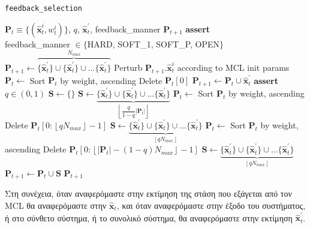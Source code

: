 \begin{algorithm}
  \caption{\texttt{feedback\_selection}}
  \begin{spacing}{1.2}
  \begin{algorithmic}[1]
    \REQUIRE $\bm{P}_t \equiv \{(\hat{\bm{x}}_t^i, w_t^i)\}$, $q$, $\hat{\bm{x}}^\prime_t$, feedback\_manner
    \ENSURE $\bm{P}_{t+1}$
    \STATE \textbf{assert} \\ feedback\_manner $\in \{$HARD, SOFT\_1, SOFT\_P, OPEN$\}$
      \STATE $\bm{P}_{t+1} \leftarrow \overbrace{\{\hat{\bm{x}}^\prime_t\} \cup \{\hat{\bm{x}}^\prime_t\} \cup \dots \{\hat{\bm{x}}^\prime_t\}}^{N_{max}}$
      \STATE Perturb $\bm{P}_{t+1}.\hat{\bm{x}}_t^i$ according to MCL init params
    \ENDIF
        \STATE $\bm{P}_t \leftarrow$ Sort $\bm{P}_t$ by weight, ascending
        \STATE Delete $\bm{P}_t[0]$
      \ENDIF
      \STATE $\bm{\bm{P}}_{t+1} \leftarrow \bm{P}_t \cup \hat{\bm{x}}^\prime_t$
    \ENDIF
      \STATE \textbf{assert} $q \in (0,1)$
      \STATE $\bm{S} \leftarrow \{\}$
        \STATE $\bm{S} \leftarrow \underbrace{\{\hat{\bm{x}}^\prime_t\} \cup \{\hat{\bm{x}}^\prime_t\} \cup \dots \{\hat{\bm{x}}^\prime_t\}}_{\left\lfloor\dfrac{q}{1-q}|\bm{P}_t|\right\rfloor}$
        \STATE $\bm{P}_t \leftarrow$ Sort $\bm{P}_t$ by weight, ascending
        \STATE Delete $\bm{P}_t[0: \left\lfloor qN_{max} \right\rfloor-1]$
        \STATE $\bm{S} \leftarrow \underbrace{\{\hat{\bm{x}}^\prime_t\} \cup \{\hat{\bm{x}}^\prime_t\} \cup \dots \{\hat{\bm{x}}^\prime_t\}}_{\left\lfloor qN_{max}\right\rfloor}$
      \ELSE
        \STATE $\bm{P}_t \leftarrow$ Sort $\bm{P}_t$ by weight, ascending
        \STATE Delete $\bm{P}_t[0: \left\lfloor |\bm{P}_t| - (1-q)N_{max} \right\rfloor-1]$
        \STATE $\bm{S} \leftarrow \underbrace{\{\hat{\bm{x}}^\prime_t\} \cup \{\hat{\bm{x}}^\prime_t\} \cup \dots \{\hat{\bm{x}}^\prime_t\}}_{\left\lfloor qN_{max}\right\rfloor}$
      \ENDIF
      \STATE $\bm{P}_{t+1} \leftarrow \bm{P}_{t} \cup \bm{S}$
    \ENDIF
    \ENDIF
    \RETURN $\bm{P}_{t+1}$
  \end{algorithmic}
  \end{spacing}
  \label{alg:feedback_selection}
\end{algorithm}

Στη συνέχεια, όταν αναφερόμαστε στην εκτίμηση της στάση που εξάγεται από τον
MCL θα αναφερόμαστε στην $\hat{\bm{x}}_t$, και όταν αναφερόμαστε στην έξοδο του
συστήματος, ή στο σύνθετο σύστημα, ή το συνολικό σύστημα, θα αναφερόμαστε στην
εκτίμηση $\hat{\bm{x}}^{\prime}_t$.


